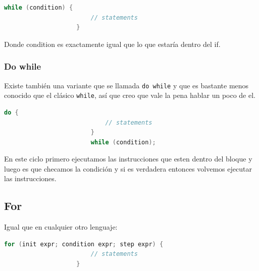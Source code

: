 \documentclass[12pt, fleqn]{report}                             %
\theoremstyle{break}                                            %
\begin{document}
                \begin{lstlisting}[language=C++, gobble=20]
                    while (condition) {
                        // statements
                    }
                \end{lstlisting}

                Donde condition es exactamente igual que lo que estaría dentro
                del if.

                \subsubsection{Do while}

                    Existe también una variante que se llamada \texttt{do while} y que 
                    es bastante menos conocido que el clásico \texttt{while}, así que creo
                    que vale la pena hablar un poco de el.

                    \begin{lstlisting}[language=C++, gobble=24]
                        do {
                            // statements
                        }
                        while (condition);
                    \end{lstlisting}

                    En este ciclo primero ejecutamos las instrucciones que esten dentro del bloque
                    y luego es que checamos la condición y si es verdadera entonces volvemos 
                    ejecutar las instrucciones.

            \subsection{For}

                Igual que en cualquier otro lenguaje:
                \begin{lstlisting}[language=C++, gobble=20]
                    for (init expr; condition expr; step expr) {
                        // statements
                    }
                \end{lstlisting}
\end{document}
